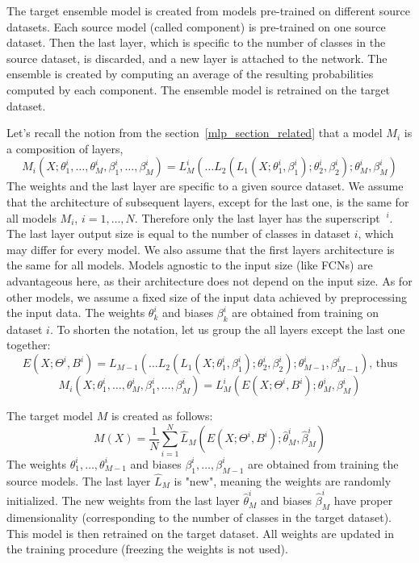 \documentclass[a4paper,11pt,twoside]{report}
\theoremstyle{definition}
\begin{document}
The target ensemble model is created from models pre-trained on different source datasets. Each source model (called component) is pre-trained on one source dataset. Then the last layer, which is specific to the number of classes in the source dataset, is discarded, and a new layer is attached to the network. The ensemble is created by computing an average of the resulting probabilities computed by each component. The ensemble model is retrained on the target dataset.

Let's recall the notion from the section~\ref{mlp_section_related} that a model $M_i$ is a composition of layers, $$M_i(X; \theta_1^i,\dots , \theta_M^i, \beta_1^i,\dots , \beta_M^i) = L_M^i(\dots L_2(L_1(X;\theta_1^i, \beta_1^i);\theta_2^i, \beta_2^i);\theta_M^i, \beta_M^i)$$
The weights and the last layer are specific to a given source dataset. We assume that the architecture of subsequent layers, except for the last one, is the same for all models $M_i$, $i=1, \dots, N$. Therefore only the last layer has the superscript $\ ^i$. The last layer output size is equal to the number of classes in dataset $i$, which may differ for every model. We also assume that the first layers architecture is the same for all models. Models agnostic to the input size (like FCNs) are advantageous here, as their architecture does not depend on the input size. As for other models, we assume a fixed size of the input data achieved by preprocessing the input data. The weights $\theta^i_k$ and biases $\beta^i_k$ are obtained from training on dataset $i$. To shorten the notation, let us group the all layers except the last one together:
$$E(X;\Theta^i, B^i) = L_{M-1}(\dots L_2(L_1(X;\theta_1^i, \beta_1^i);\theta_2^i, \beta_2^i);\theta_{M-1}^i, \beta_{M-1}^i) \text{, thus}$$
$$M_i(X; \theta_1^i,\dots , \theta_M^i, \beta_1^i,\dots , \beta_M^i) =  L_M^i(E(X; \Theta^i, B^i);\theta_M^i, \beta_M^i)$$

The target model $M$ is created as follows:
$$M(X) = \frac{1}{N} \sum_{i=1}^N \hat L_M( E(X; \Theta^i, B^i);\hat\theta_M^i, \hat\beta_M^i )$$
The weights $\theta_1^i, \dots, \theta_{M-1}^i$ and biases $\beta_1^i, \dots, \beta_{M-1}^i$ are obtained from training the source models. The last layer $\hat L_M$ is "new", meaning the weights are randomly initialized. The new weights from the last layer $\hat\theta_M^i$ and biases $\hat\beta_M^i$ have proper dimensionality (corresponding to the number of classes in the target dataset). This model is then retrained on the target dataset. All weights are updated in the training procedure (freezing the weights is not used).
\end{document}
